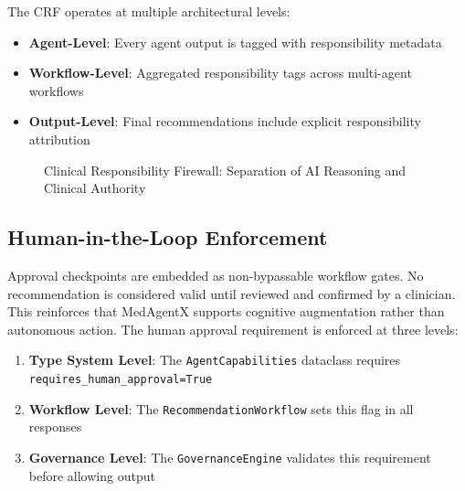 \documentclass[conference]{IEEEtran}
\begin{document}
The CRF operates at multiple architectural levels:
\begin{itemize}
    \item \textbf{Agent-Level}: Every agent output is tagged with responsibility metadata
    \item \textbf{Workflow-Level}: Aggregated responsibility tags across multi-agent workflows
    \item \textbf{Output-Level}: Final recommendations include explicit responsibility attribution
\end{itemize}

\begin{figure}[H]
\centering
{}
\caption{Clinical Responsibility Firewall: Separation of AI Reasoning and Clinical Authority}
\label{fig:crf}
\end{figure}

\subsection{Human-in-the-Loop Enforcement}
Approval checkpoints are embedded as non-bypassable workflow gates. No recommendation is considered valid until reviewed and confirmed by a clinician. This reinforces that MedAgentX supports cognitive augmentation rather than autonomous action. The human approval requirement is enforced at three levels:

\begin{enumerate}
    \item \textbf{Type System Level}: The \texttt{AgentCapabilities} dataclass requires \texttt{requires\_human\_approval=True}
    \item \textbf{Workflow Level}: The \texttt{RecommendationWorkflow} sets this flag in all responses
    \item \textbf{Governance Level}: The \texttt{GovernanceEngine} validates this requirement before allowing output
\end{enumerate}
\end{document}
